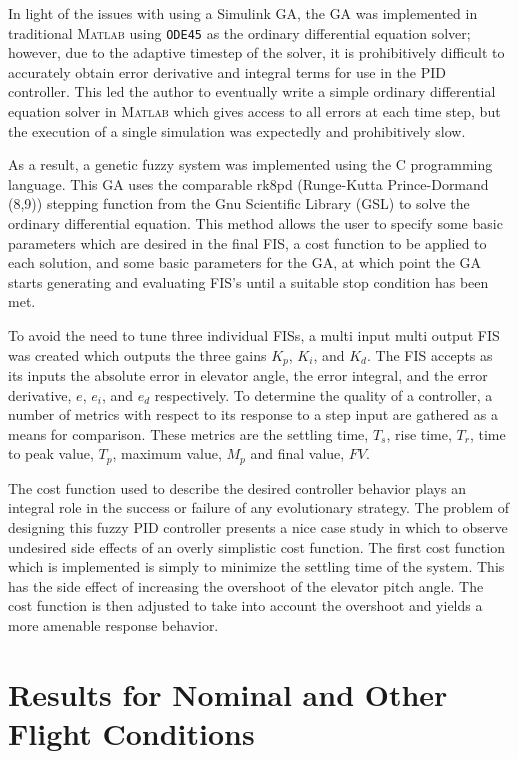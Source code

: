 In light of the issues with using a Simulink GA, the GA was implemented in traditional \textsc{Matlab} using
\verb|ODE45| as the ordinary differential equation solver; however, due to the adaptive timestep of the
solver, it is prohibitively difficult to accurately obtain error derivative and integral terms for use in the
PID controller. This led the author to eventually write a simple ordinary differential equation solver in
\textsc{Matlab} which gives access to all errors at each time step, but the execution of a single simulation
was expectedly and prohibitively slow.

As a result, a genetic fuzzy system was implemented  using  the C programming language\cite{fuzzyc}.  This GA uses the
comparable rk8pd (Runge-Kutta Prince-Dormand (8,9)) stepping function from the Gnu Scientific Library (GSL) to
solve the ordinary differential equation. This method allows the user to specify some basic parameters which
are desired in the final FIS, a cost function to be applied to each solution, and some basic parameters for
the GA, at which point the GA starts generating and evaluating FIS's until a suitable stop condition has been
met.

To avoid the need to tune three individual FISs, a multi input multi output FIS was created which outputs the
three gains $K_p$, $K_i$, and $K_d$. The FIS accepts as its inputs the absolute error in elevator angle, the
error integral, and the error derivative, $e$, $e_i$, and $e_d$ respectively. To determine the quality of a
controller, a number of metrics with respect to its response to a step input are gathered as a means for
comparison. These metrics are the settling time, $T_s$, rise time, $T_r$, time to peak value, $T_p$, maximum
value, $M_p$ and final value, $FV$.

The cost function used to describe the desired controller behavior plays an integral role in the success or
failure of any evolutionary strategy. The problem of designing this fuzzy PID controller presents a nice case
study in which to observe undesired side effects of an overly simplistic cost function. The first cost function
which is implemented is simply to minimize the settling time of the system. This has the side effect of
increasing the overshoot of the elevator pitch angle. The cost function is then adjusted to take into account
the overshoot and yields a more amenable response behavior.

\section{Results for Nominal and Other Flight Conditions}

